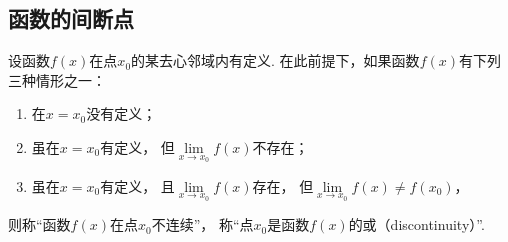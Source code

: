 %
%
%

\subsection{函数的间断点}
设函数\(f(x)\)在点\(x_0\)的某去心邻域内有定义.
在此前提下，如果函数\(f(x)\)有下列三种情形之一：
\begin{enumerate}
	\item 在\(x=x_0\)没有定义；
	\item 虽在\(x=x_0\)有定义，
	但\(\lim\limits_{x \to x_0} f(x)\)不存在；
	\item 虽在\(x=x_0\)有定义，
	且\(\lim\limits_{x \to x_0} f(x)\)存在，
	但\(\lim\limits_{x \to x_0} f(x) \neq f(x_0)\)，
\end{enumerate}
则称“函数\(f(x)\)在点\(x_0\)不连续”，
称“点\(x_0\)是函数\(f(x)\)的或（discontinuity）”.

\begin{figure}[ht]
	\centering
	\caption{}
	\label{figure:极限.无穷间断点}
\end{figure}

